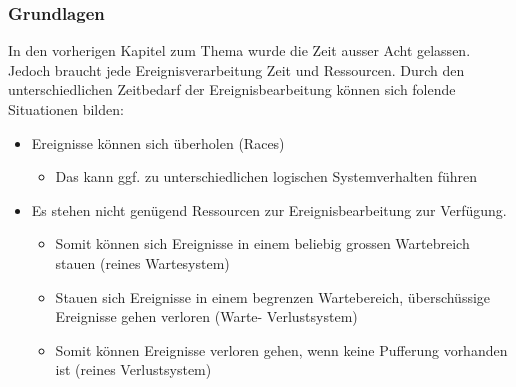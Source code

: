 \subsubsection{Grundlagen}
In den vorherigen Kapitel zum Thema wurde die Zeit ausser Acht gelassen. Jedoch braucht jede Ereignisverarbeitung Zeit und Ressourcen. Durch den unterschiedlichen Zeitbedarf der Ereignisbearbeitung können sich folende Situationen bilden:
\begin{itemize}
    \item Ereignisse können sich überholen (Races)
    \begin{itemize}
        \item Das kann ggf. zu unterschiedlichen logischen Systemverhalten führen
    \end{itemize}
    \item Es stehen nicht genügend Ressourcen zur Ereignisbearbeitung zur Verfügung.
    \begin{itemize}
        \item Somit können sich Ereignisse in einem beliebig grossen Wartebreich stauen (reines Wartesystem)
        \item Stauen sich Ereignisse in einem begrenzen Wartebereich, überschüssige Ereignisse gehen verloren (Warte- Verlustsystem)
        \item Somit können Ereignisse verloren gehen, wenn keine Pufferung vorhanden ist (reines Verlustsystem)
    \end{itemize}
\end{itemize}

